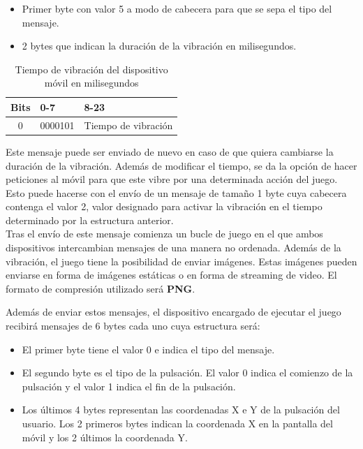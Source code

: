 \begin {itemize}
\item Primer byte con valor 5 a modo de cabecera para que se sepa el tipo del mensaje.
\item 2 bytes que indican la duraci\'on de la vibraci\'on en milisegundos.
\end {itemize}

\begin{table}[h!]
\centering
\begin{tabular}{|l|l|l|} 
\hline
Bits                    & 0-7                   & 8-23                   \\
\hline
\multicolumn{1}{|c|}{0} & \multicolumn{1}{c|}{0000101} & \multicolumn{1}{c|}{Tiempo de vibraci\'on}  \\
\hline
\end{tabular}
\caption{Tiempo de vibraci\'on del dispositivo m\'ovil en milisegundos}
\label{table:2}
\end{table}

Este mensaje puede ser enviado de nuevo en caso de que quiera cambiarse la duraci\'on de la vibraci\'on. Adem\'as de modificar el tiempo, se da la opci\'on de hacer peticiones al m\'ovil para que este vibre por una determinada acci\'on del juego. Esto puede hacerse con el env\'io de un mensaje de tama\~no 1 byte cuya cabecera contenga el valor 2, valor designado para activar la vibraci\'on en el tiempo determinado por la estructura anterior.\\

Tras el env\'io de este mensaje comienza un bucle de juego en el que ambos dispositivos intercambian mensajes de una manera no ordenada. Adem\'as de la vibraci\'on, el juego tiene la posibilidad de enviar im\'agenes. Estas im\'agenes pueden enviarse en forma de im\'agenes est\'aticas o en forma de streaming de video. El formato de compresi\'on utilizado ser\'a \textbf{PNG}.

Adem\'as de enviar estos mensajes, el dispositivo encargado de ejecutar el juego recibir\'a mensajes de 6 bytes cada uno cuya estructura ser\'a:
\begin {itemize}
\item El primer byte tiene el valor 0 e indica el tipo del mensaje.
\item El segundo byte es el tipo de la pulsaci\'on. El valor 0 indica el comienzo de la pulsaci\'on y el valor 1 indica el fin de la pulsaci\'on.
\item Los \'ultimos 4 bytes representan las coordenadas X e Y de la pulsaci\'on del usuario. Los 2 primeros bytes indican la coordenada X en la pantalla del m\'ovil y los 2 \'ultimos la coordenada Y.
\end {itemize}

